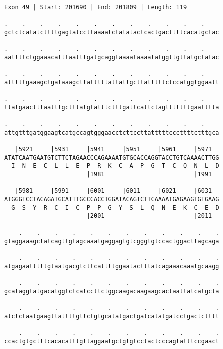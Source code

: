 \documentclass{article}
\begin{document}
\begin{Verbatim}
Exon 49 | Start: 201690 | End: 201809 | Length: 119
 
.    .    .    .    .    .    .    .    .    .    .    .    
gctctcatatcttttgagtatccttaaaatctatatactcactgacttttcacatgctac
  
.    .    .    .    .    .    .    .    .    .    .    .    
aattttctggaaacatttaatttgatgcaggtaaaataaaatatggttgttatgctatac
  
.    .    .    .    .    .    .    .    .    .    .    .    
atttttgaaagctgataaagcttatttttattattgcttatttttctccatggtggaatt
  
.    .    .    .    .    .    .    .    .    .    .    .    
ttatgaactttaatttgctttatgtatttctttgattcattctagtttttttgaatttta
  
.    .    .    .    .    .    .    .    .    .    .    .    
attgtttgatggaagtcatgccagtgggaacctcttccttatttttcccttttctttgca
  
   |5921     |5931     |5941     |5951     |5961     |5971  
ATATCAATGAATGTCTTCTAGAACCCAGAAAATGTGCACCAGGTACCTGTCAAAACTTGG
  I  N  E  C  L  L  E  P  R  K  C  A  P  G  T  C  Q  N  L  D
                       |1981                         |1991  
  
   |5981     |5991     |6001     |6011     |6021     |6031  
ATGGGTCCTACAGATGCATTTGCCCACCTGGATACAGTCTTCAAAATGAGAAGTGTGAAG
  G  S  Y  R  C  I  C  P  P  G  Y  S  L  Q  N  E  K  C  E  D
                       |2001                         |2011  
  
    .    .    .    .    .    .    .    .    .    .    .    .
gtaggaaagctatcagttgtagcaaatgaggagtgtcgggtgtccactggacttagcaga
  
    .    .    .    .    .    .    .    .    .    .    .    .
atgagaatttttgtaatgacgtcttcattttggaatactttatcagaaacaaatgcaagg
  
    .    .    .    .    .    .    .    .    .    .    .    .
gcataggtatgacatggtctcatccttctggcaagacaagaagcactaattatcatgcta
  
    .    .    .    .    .    .    .    .    .    .    .    .
atctctaatgaagttattttgttctgtgcatatgactgatcatatgatcctgactctttt
  
    .    .    .    .    .    .    .    .    .    .    .    .
ccactgtgctttcacacatttgttaggaatgctgtgtcctactcccagtatttccgaact
\end{Verbatim}
\newpage
\end{document}
